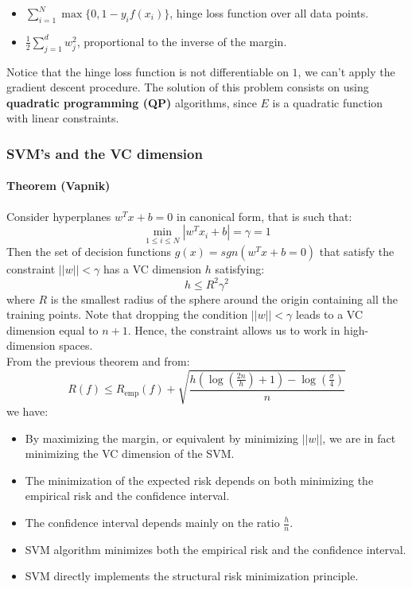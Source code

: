 \begin{itemize}
	\item $\sum\limits_{i=1}^N\max\{0,1-y_if(x_i)\}$, hinge loss function over all data points.
	\item $\frac{1}{2}\sum\limits_{j = 1}^dw_j^2$, proportional to the inverse of the margin.
\end{itemize}
Notice that the hinge loss function is not differentiable on $1$, we can't apply the gradient descent procedure. The solution of this problem consists on using \textbf{quadratic programming (QP)} algorithms, since $E$ is a quadratic function with linear constraints.


\subsubsection{SVM's and the VC dimension}
\paragraph{Theorem (Vapnik)} Consider hyperplanes $w^Tx+b= 0$ in canonical form, that is such that:
$$\min\limits_{1\leq i \leq N}|w^Tx_i+b| = \gamma = 1$$
Then the set of decision functions $g(x) = sgn(w^Tx+b = 0)$ that satisfy the constraint $||w|| < \gamma$ has a VC dimension $h$ satisfying:
$$h \leq R^2\gamma^2$$
where $R$ is the smallest radius of the sphere around the origin containing all the training points. Note that dropping the condition $||w|| < \gamma$ leads to a VC dimension equal to $n+1$. Hence, the constraint allows us to work in high-dimension spaces. \\
From the previous theorem and from:
$$R(f) \leq R_{\text{emp}}(f) + \sqrt{\frac{h(\log(\frac{2n}{h})+1)-\log(\frac{\sigma}{4})}{n}}$$
we have:
\begin{itemize}
	\item By maximizing the margin, or equivalent by minimizing $||w||$, we are in fact minimizing the VC dimension of the SVM.
	\item The minimization of the expected risk depends on both minimizing the empirical risk and the confidence interval.
	\item The confidence interval depends mainly on the ratio $\frac{h}{n}$.
	\item SVM algorithm minimizes both the empirical risk and the confidence interval.
	\item SVM directly implements the structural risk minimization principle.
\end{itemize}

